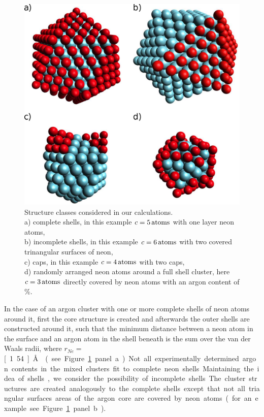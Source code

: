 \begin{figure}[h!]
 \centering
 \includegraphics[scale=0.9]{pics/NeAr_structures1.eps}
 \caption{Structure classes considered in our calculations.\\
          a) complete shells, in this example $c=\unit[5]{atoms}$ with one layer
          neon atoms,\\
          b) incomplete shells, in this example
          $c=\unit[6]{atoms}$ with two covered trinangular surfaces
          of neon,\\
          c) caps, in this example $c=\unit[4]{atoms}$ with two caps,\\
          d) randomly arranged neon atoms around a full shell cluster,
          here $c=\unit[3]{atoms}$ directly covered by neon atoms
          with an argon content of \unit[47]{\%}.}
 \label{figure:structures}
\end{figure}

In the case of an argon cluster with one or more complete shells of neon
atoms around it, first the core structure is created and afterwards the
outer shells are constructed around it, such that the minimum distance between a
neon atom in the surface and an argon atom in the shell beneath is the sum
over the van der Waals radii, where $r_{Ne}=$\unit[1.54]{\AA} \cite{Bondi64}
(see Figure \ref{figure:structures} panel a).

Not all experimentally determined argon contents in the mixed clusters
fit to complete neon shells. Maintaining the idea of shells,
we consider the possibility of incomplete shells.
The cluster structures are created analogously to the
complete shells except that not all triangular surfaces areas of the argon core
are covered by neon atoms (for an example see Figure \ref{figure:structures}
panel b).

